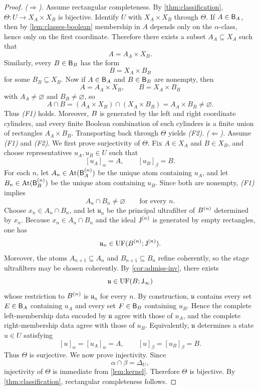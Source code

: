 \begin{proof}
	\emph{(\(\Rightarrow\)).}
	Assume rectangular completeness. By \cref{thm:classification},
	\(\Theta:U\to X_A\times X_B\) is bijective. Identify \(U\) with
	\(X_A\times X_B\) through \(\Theta\).
	If \(A\in\mathsf B_A\), then by \cref{lem:classes-boolean} membership in \(A\)
	depends only on the \(\alpha\)-class, hence only on the first
	coordinate. Therefore there exists a subset \(A_A\subseteq X_A\) such
	that
	\[
		A=A_A\times X_B.
	\]
	Similarly, every \(B\in\mathsf B_B\) has the form
	\[
		B=X_A\times B_B
	\]
	for some \(B_B\subseteq X_B\).
	Now if \(A\in\mathsf B_A\) and \(B\in\mathsf B_B\) are nonempty, then
	\[
		A=A_A\times X_B,
		\qquad
		B=X_A\times B_B
	\]
	with \(A_A\neq\varnothing\) and \(B_B\neq\varnothing\), so
	\[
		A\cap B=(A_A\times X_B)\cap(X_A\times B_B)=A_A\times B_B\neq\varnothing.
	\]
	Thus \emph{(F1)} holds.
	Moreover, \(B\) is generated by the left and right coordinate
	cylinders, and every finite Boolean combination of such cylinders is a
	finite union of rectangles \(A_A\times B_B\). Transporting back through
	\(\Theta\) yields \emph{(F2)}.
	\medskip
	\emph{(\(\Leftarrow\)).}
	Assume \emph{(F1)} and \emph{(F2)}.
	We first prove surjectivity of \(\Theta\). Fix \(A\in X_A\) and
	\(B\in X_B\), and choose representatives \(u_A,u_B\in U\) such that
	\[
		[u_A]_\alpha=A,
		\qquad
		[u_B]_\beta=B.
	\]
	For each \(n\), let \(A_n\in\mathrm{At}(\mathsf B_A^{(n)})\) be the unique atom
	containing \(u_A\), and let \(B_n\in\mathrm{At}(\mathsf B_B^{(n)})\) be the
	unique atom containing \(u_B\). Since both are nonempty, \emph{(F1)}
	implies
	\[
		A_n\cap B_n\neq\varnothing
		\qquad
		\text{for every }n.
	\]
	Choose \(x_n\in A_n\cap B_n\), and let \(\mathfrak u_n\) be the
	principal ultrafilter of \(B^{(n)}\) determined by \(x_n\). Because
	\(x_n\in A_n\cap B_n\) and the ideal \(\mathsf J^{(n)}\) is generated by empty
	rectangles, one has
	\[
		\mathfrak u_n\in \operatorname{UF}(B^{(n)};\mathsf J^{(n)}).
	\]
	Moreover, the atoms \(A_{n+1}\subseteq A_n\) and \(B_{n+1}\subseteq B_n\)
	refine coherently, so the stage ultrafilters may be chosen coherently.
	By \cref{cor:admiss-inv}, there exists
	\[
		\mathfrak u\in \operatorname{UF}(B;\mathsf J_\infty)
	\]
	whose restriction to \(B^{(n)}\) is \(\mathfrak u_n\) for every \(n\).
	By construction, \(\mathfrak u\) contains every set \(E\in\mathsf B_A\)
	containing \(u_A\) and every set \(F\in\mathsf B_B\) containing \(u_B\). Hence
	the complete left-membership data encoded by \(\mathfrak u\) agree with
	those of \(u_A\), and the complete right-membership data agree with
	those of \(u_B\). Equivalently, \(\mathfrak u\) determines a state
	\(u\in U\) satisfying
	\[
		[u]_\alpha=[u_A]_\alpha=A,
		\qquad
		[u]_\beta=[u_B]_\beta=B.
	\]
	Thus \(\Theta\) is surjective.
	We now prove injectivity. Since
	\[
		\alpha\cap\beta=\Delta_U,
	\]
	injectivity of \(\Theta\) is immediate from \cref{lem:kernel}.
	Therefore \(\Theta\) is bijective. By \cref{thm:classification},
	rectangular completeness follows.
\end{proof}
